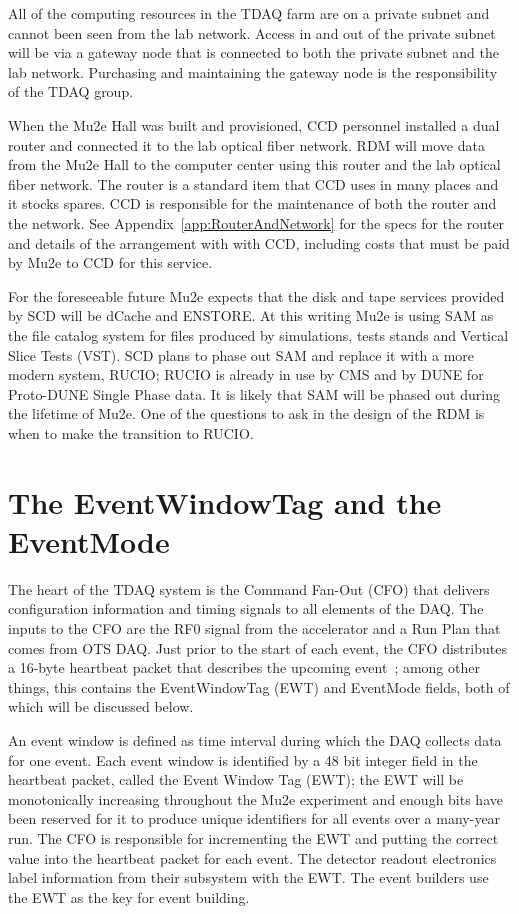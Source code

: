 All of the computing resources in the TDAQ farm are on a private subnet
and cannot been seen from the lab network.  Access in and out
of the private subnet will be via a gateway node that is connected to
both the private subnet and the lab network.
Purchasing and maintaining the gateway node is the responsibility of the TDAQ group.

When the Mu2e Hall was built and provisioned, CCD personnel installed a dual router
and connected it to the lab optical fiber network.
RDM will move data from the Mu2e Hall
to the computer center using this router and the lab optical fiber network.
The router is a standard item that CCD uses in many places and it stocks spares.
CCD is responsible for the maintenance of both the router and the network.
See Appendix~\ref{app:RouterAndNetwork} for the
specs for the router and details of the arrangement with with CCD,
including costs that must be paid by Mu2e to CCD for this service.


For the foreseeable future Mu2e expects that the disk and tape services provided
by SCD will be dCache and ENSTORE.
At this writing Mu2e is using SAM as the file catalog system for files produced
by simulations, tests stands and Vertical Slice Tests (VST).
SCD plans to phase out SAM and replace it with a more modern system, RUCIO\cite{RUCIOHome};
RUCIO is already in use by CMS and by DUNE for Proto-DUNE Single Phase data.
It is likely that SAM will be phased out during the lifetime of Mu2e.
One of the questions to ask in the design of the RDM is
when to make the transition to RUCIO.

\section{The EventWindowTag and the EventMode}
\label{sec:EWTagAndEventMode}

The heart of the TDAQ system is the Command Fan-Out (CFO) that delivers
configuration information and timing signals to all elements of the DAQ.
The inputs to the CFO are the RF0 signal from the accelerator
and a Run Plan that comes from OTS DAQ.
Just prior to the start of each event,
the CFO distributes a 16-byte heartbeat packet that describes the upcoming event~\cite{PacketProtocols};
among other things, this contains the EventWindowTag (EWT) and EventMode fields,
both of which will be discussed below.

An event window is defined as time interval during which the DAQ collects data for one event.
Each event window is identified by a 48 bit integer field in the heartbeat packet, called
the Event Window Tag (EWT);
the EWT will be monotonically increasing throughout the Mu2e experiment and
enough bits have been reserved for it to produce unique identifiers for all
events over a many-year run.
The CFO is responsible for incrementing the EWT and putting the correct value into
the heartbeat packet for each event.
The detector readout electronics label information from their subsystem with the EWT.
The event builders use the EWT as the key for event building.

